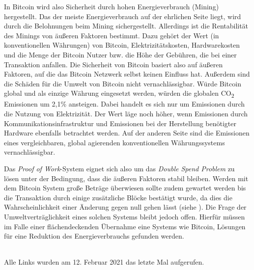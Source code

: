 \documentclass[ngerman,runningheads,a4paper]{llncs}[2018/03/10]
\begin{document}
In Bitcoin wird also Sicherheit durch hohen Energieverbrauch (Mining) hergestellt. Das der meiste Energieverbrauch auf der ehrlichen Seite liegt, wird durch die Belohnungen beim Mining sichergestellt. Allerdings ist die Rentabilität des Minings von äußeren Faktoren bestimmt. Dazu gehört der Wert (in konventionellen Währungen) von Bitcoin, Elektrizitätskosten, Hardwarekosten und die Menge der Bitcoin Nutzer bzw. die Höhe der Gebühren, die bei einer Transaktion anfallen. Die Sicherheit von Bitcoin basiert also auf äußeren Faktoren, auf die das Bitcoin Netzwerk selbst keinen Einfluss hat. Außerdem sind die Schäden für die Umwelt von Bitcoin nicht vernachlässigbar. Würde Bitcoin global und als einzige Währung eingesetzt werden, würden die globalen CO\textsubscript{2} Emissionen um 2,1\% ansteigen. Dabei handelt es sich nur um Emissionen durch die Nutzung von Elektrizität. Der Wert läge noch höher, wenn Emissionen durch Kommunikationsinfrastruktur und Emissionen bei der Herstellung benötigter Hardware ebenfalls betrachtet werden. Auf der anderen Seite sind die Emissionen eines vergleichbaren, global agierenden  konventionellen Währungssystems vernachlässigbar. 

Das \textit{Proof of Work}-System eignet sich also um das \textit{Double Spend Problem} zu lösen unter der Bedingung, dass die äußeren Faktoren stabil bleiben. Werden mit dem Bitcoin System große Beträge überwiesen sollte zudem gewartet werden bis die Transaktion durch einige zusätzliche Blöcke bestätigt wurde, da dies die Wahrscheinlichkeit einer Änderung gegen null gehen lässt (siehe ). Die Frage der Umweltverträglichkeit eines solchen Systems bleibt jedoch offen. Hierfür müssen im Falle einer flächendeckenden Übernahme eine Systems wie Bitcoin, Lösungen für eine Reduktion des Energieverbrauchs gefunden werden. 

\renewcommand{\bibsection}{\section*{Referenzen}} %

\begingroup
  \ifluatex
  \else
  \fi
  \small %
  
\endgroup

\ \\
%
Alle Links wurden am 12. Februar 2021 das letzte Mal aufgerufen.
\end{document}

